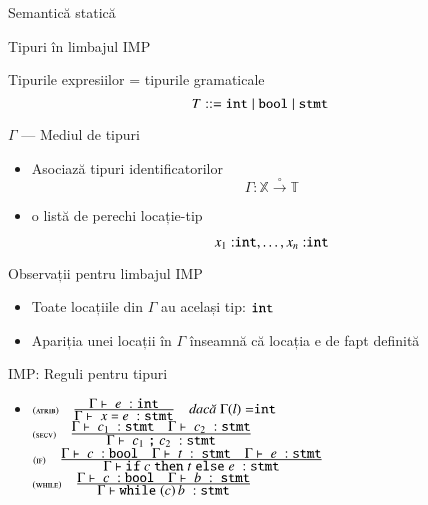 \documentclass[xcolor=pdftex,romanian,colorlinks]{beamer}
\begin{document}
\begin{section}{Semantică statică}
    \begin{frame}{Tipuri în limbajul IMP}
    \begin{block}{Tipurile expresiilor = tipurile gramaticale}
    \[T ::= {\mathrel{\text{\ttfamily int}}} \mid {\ensuremath\mathrel{\text{\ttfamily bool}}} \mid {\ensuremath\mathrel{\text{\ttfamily stmt}}}\]
    \end{block}
    \begin{block}{$\Gamma$ --- Mediul de tipuri}
    \begin{itemize}
    \item Asociază tipuri identificatorilor
    \[\Gamma : \mathbb{X} \xrightarrow{\circ}\mathbb{T}\]
    \item {} o listă de perechi locație-tip

    \[x_1:\mathrel{\text{\ttfamily int}}, \ldots, x_n:\mathrel{\text{\ttfamily int}}\]
    \end{itemize}
  \end{block}
    \vfill
    \begin{block}{Observații pentru limbajul IMP}
    \begin{itemize}
    \item Toate locațiile din $\Gamma$ au același tip: $\mathrel{\text{\ttfamily int}}$
    \item Apariția unei locații în $\Gamma$ înseamnă că locația e de fapt definită
    \end{itemize}
    \end{block}
    \end{frame}

    \begin{frame}{IMP: Reguli pentru tipuri}
    \begin{itemize}
    \vitem[] $\reg[loc]{\tjud{x}{int}}{}{\Gamma(x) = \Sint}$
    \vitem[] $\reg[int]{\tjud{n}{\Sint}}{}{n \in \mathbb{Z}}$
    \vitem[] $\reg[op+]{\tjud{e_1 + e_2}{\Sint}}{\tjud{e_1}{\Sint} \si \tjud{e_2}{\Sint}}{}$
    \vitem[] $\reg[bool]{\tjud{b}{\Sbool}}{}{b\in \{\Strue,\Sfalse\}}$
    \vitem[] $\reg[op$\leq$]{\tjud{e_1 \terminal{<=} e_2}{\Sbool}}{\tjud{e_1}{\Sint} \si \tjud{e_2}{\Sint}}{}$
    \item[] $\reg[atrib]{\tjud{x\terminal{=}e}{\terminal{stmt}}}{\tjud{e}{\Sint}}{\Gamma(l) = \Sint}$
    \vitem[] $\reg[secv]{\tjud{c_1\terminal{;} c_2}{\terminal{stmt}}}{\tjud{c_1}{\terminal{stmt}}\si \tjud{c_2}{\terminal{stmt}}}{}$
    \vitem[] $\reg[if]{\tjud{\Sif c \Sthen t \Selse e}{\terminal{stmt}}}{\tjud{c}{\Sbool} \si \tjud{t}{{\terminal{stmt}}} \si \tjud{e}{\terminal{stmt}}}{}$
    \vitem[] $\reg[while]{\tjud{\Swhile (c)\,b}{\terminal{stmt}}}{\tjud{c}{\Sbool} \si \tjud{b}{{\terminal{stmt}}}}{}$
    \end{itemize}
    \end{frame}

\end{section}
\end{document}
